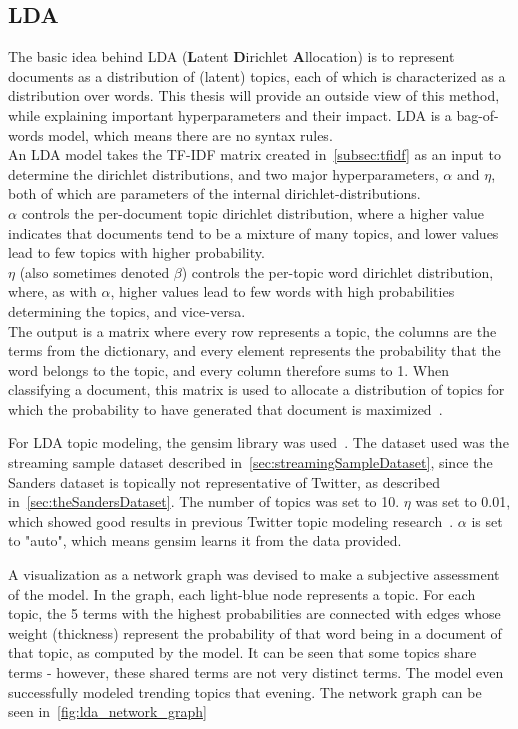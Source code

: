 \subsection{LDA}
\label{subsec:lda}

The basic idea behind LDA (\textbf{L}atent \textbf{D}irichlet \textbf{A}llocation) is to represent documents as a distribution of (latent) topics,
each of which is characterized as a distribution over words.
This thesis will provide an outside view of this method, while explaining important hyperparameters and their impact.
LDA is a bag-of-words model, which means there are no syntax rules.
\\
An LDA model takes the TF-IDF matrix created in~\ref{subsec:tfidf} as an input to determine the dirichlet distributions,
and two major hyperparameters, $\alpha$ and $\eta$,
both of which are parameters of the internal dirichlet-distributions.
\\
$\alpha$ controls the per-document topic dirichlet distribution,
where a higher value indicates that documents tend to be a mixture of many topics,
and lower values lead to few topics with higher probability.
\\
$\eta$ (also sometimes denoted $\beta$) controls the per-topic word dirichlet distribution, where, as with $\alpha$,
higher values lead to few words with high probabilities determining the topics,
and vice-versa.
\\
The output is a matrix where every row represents a topic,
the columns are the terms from the dictionary,
and every element represents the probability that the word belongs to the topic,
and every column therefore sums to 1.
When classifying a document, this matrix is used to allocate a distribution of topics for which the probability to have generated that document is maximized~\cite{Blei2003}.
\par
For LDA topic modeling, the gensim library was used~\cite{gensimDocs}.
The dataset used was the streaming sample dataset described in~\ref{sec:streamingSampleDataset},
since the Sanders dataset is topically not representative of Twitter, as described in~\ref{sec:theSandersDataset}.
The number of topics was set to 10.
$\eta$ was set to 0.01, which showed good results in previous Twitter topic modeling research~\cite{Hong2010}.
$\alpha$ is set to "auto", which means gensim learns it from the data provided.
\par
A visualization as a network graph was devised to make a subjective assessment of the model.
In the graph, each light-blue node represents a topic.
For each topic, the 5 terms with the highest probabilities are connected with edges whose weight (thickness) represent the probability
of that word being in a document of that topic, as computed by the model.
It can be seen that some topics share terms - however, these shared terms are not very distinct terms.
The model even successfully modeled trending topics that evening.
The network graph can be seen in~\ref{fig:lda_network_graph}

